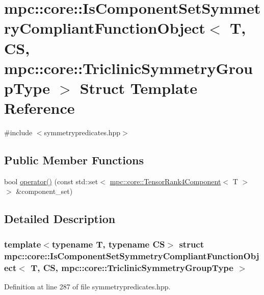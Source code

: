 \hypertarget{structmpc_1_1core_1_1_is_component_set_symmetry_compliant_function_object_3_01_t_00_01_c_s_00_01d3c1d925f2eca11cbddbc5600942f490}{}\section{mpc\+:\+:core\+:\+:Is\+Component\+Set\+Symmetry\+Compliant\+Function\+Object$<$ T, CS, mpc\+:\+:core\+:\+:Triclinic\+Symmetry\+Group\+Type $>$ Struct Template Reference}
\label{structmpc_1_1core_1_1_is_component_set_symmetry_compliant_function_object_3_01_t_00_01_c_s_00_01d3c1d925f2eca11cbddbc5600942f490}


{\ttfamily \#include $<$symmetrypredicates.\+hpp$>$}

\subsection*{Public Member Functions}
\begin{DoxyCompactItemize}
\item 
bool \mbox{\hyperlink{structmpc_1_1core_1_1_is_component_set_symmetry_compliant_function_object_3_01_t_00_01_c_s_00_01d3c1d925f2eca11cbddbc5600942f490_afe0b64cc452da24122005d62f5f5c724}{operator()}} (const std\+::set$<$ \mbox{\hyperlink{namespacempc_1_1core_ac3a232afc7c680d580628e834030482f}{mpc\+::core\+::\+Tensor\+Rank4\+Component}}$<$ T $>$ $>$ \&component\+\_\+set)
\end{DoxyCompactItemize}


\subsection{Detailed Description}
\subsubsection*{template$<$typename T, typename CS$>$\newline
struct mpc\+::core\+::\+Is\+Component\+Set\+Symmetry\+Compliant\+Function\+Object$<$ T, C\+S, mpc\+::core\+::\+Triclinic\+Symmetry\+Group\+Type $>$}



Definition at line 287 of file symmetrypredicates.\+hpp.



